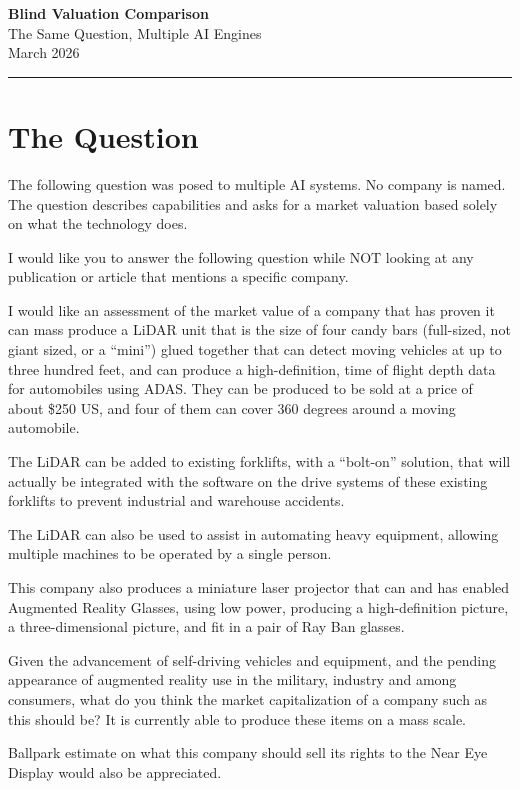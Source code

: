 \documentclass[11pt,letterpaper]{article}
\begin{document}
\begin{center}
{\LARGE\bfseries\color{secblue} Blind Valuation Comparison}\\[0.3em]
{\large\color{dimgray} The Same Question, Multiple AI Engines}\\[0.4em]
{\normalsize March 2026}
\end{center}

\vspace{0.5em}
\hrule
\vspace{1em}

\section{The Question}

The following question was posed to multiple AI systems. No company is named. The question describes capabilities and asks for a market valuation based solely on what the technology does.

\begin{framed}
\small
I would like you to answer the following question while NOT looking at any publication or article that mentions a specific company.

I would like an assessment of the market value of a company that has proven it can mass produce a LiDAR unit that is the size of four candy bars (full-sized, not giant sized, or a ``mini'') glued together that can detect moving vehicles at up to three hundred feet, and can produce a high-definition, time of flight depth data for automobiles using ADAS. They can be produced to be sold at a price of about \$250 US, and four of them can cover 360 degrees around a moving automobile.

The LiDAR can be added to existing forklifts, with a ``bolt-on'' solution, that will actually be integrated with the software on the drive systems of these existing forklifts to prevent industrial and warehouse accidents.

The LiDAR can also be used to assist in automating heavy equipment, allowing multiple machines to be operated by a single person.

This company also produces a miniature laser projector that can and has enabled Augmented Reality Glasses, using low power, producing a high-definition picture, a three-dimensional picture, and fit in a pair of Ray Ban glasses.

Given the advancement of self-driving vehicles and equipment, and the pending appearance of augmented reality use in the military, industry and among consumers, what do you think the market capitalization of a company such as this should be? It is currently able to produce these items on a mass scale.

Ballpark estimate on what this company should sell its rights to the Near Eye Display would also be appreciated.
\end{framed}
\end{document}
